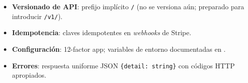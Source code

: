 \begin{itemize}[leftmargin=*,itemsep=0.2em]
  \item \textbf{Versionado de API}: prefijo implícito \texttt{/} (no
        se versiona aún; preparado para introducir \texttt{/v1/}).
  \item \textbf{Idempotencia}: claves idempotentes en \emph{webhooks}
        de Stripe.
  \item \textbf{Configuración}: 12-factor app; variables de entorno
        documentadas en .
  \item \textbf{Errores}: respuesta uniforme JSON
        \texttt{\{detail: string\}} con códigos HTTP apropiados.
\end{itemize}
